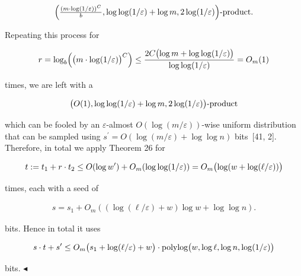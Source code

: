 \[\begin{gathered}
\Bigl{(}\tfrac{(m\cdot\log(1/\varepsilon))^{C}}{b},\log\log(1/\varepsilon)+\log m,2\log(1/\varepsilon)\Bigr{)}\text{-product.}
\end{gathered}\]


Repeating this process for\par


\[\begin{gathered}
\displaystyle r=\log_{b}\Bigl{(}\bigl{(}m\cdot\log(1/\varepsilon)\bigr{)}^{C}\Bigr{)}\leq\frac{2C\bigl{(}\log m+\log\log(1/\varepsilon)\bigr{)}}{\log\log(1/\varepsilon)}=O_{m}(1)
\end{gathered}\]


times, we are left with a\par


\[\begin{gathered}
\bigl{(}O(1),\log\log(1/\varepsilon)+\log m,2\log(1/\varepsilon)\bigr{)}\text{-product}
\end{gathered}\]


which can be fooled by an $\varepsilon$-almost $O(\log(m/\varepsilon))$-wise uniform distribution that can be sampled using $s^{\prime}=O(\log(m/\varepsilon)+\log\log n)$ bits [41, 2].
Therefore, in total we apply Theorem 26 for\par


\[\begin{gathered}
\displaystyle t:=t_{1}+r\cdot t_{2}\leq O(\log w^{\prime})+O_{m}(\log\log(1/\varepsilon))=O_{m}\bigl{(}\log(w+\log(\ell/\varepsilon))\bigr{)}
\end{gathered}\]


times, each with a seed of\par


\[\begin{gathered}
s=s_{1}+O_{m}((\log(\ell/\varepsilon)+w)\log w+\log\log n).
\end{gathered}\]


bits.
Hence in total it uses\par


\[\begin{gathered}
\displaystyle s\cdot t+s^{\prime} \displaystyle\leq O_{m}\bigl{(}s_{1}+\log(\ell/\varepsilon)+w\bigr{)}\cdot\textnormal{polylog}\bigl{(}w,\log\ell,\log n,\log(1/\varepsilon)\bigr{)}
\end{gathered}\]


bits.
$\blacktriangleleft$\par





